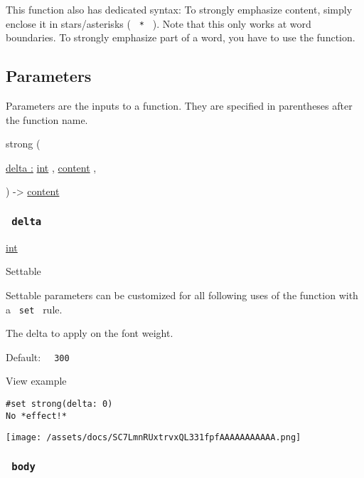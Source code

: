 This function also has dedicated syntax: To strongly emphasize content,
simply enclose it in stars/asterisks ( \texttt{\ *\ } ). Note that this
only works at word boundaries. To strongly emphasize part of a word, you
have to use the function.

\subsection{\texorpdfstring{{ Parameters
}}{ Parameters }}\label{parameters}

\label{parameters-tooltip}
Parameters are the inputs to a function. They are specified in
parentheses after the function name.

{ strong } (

{ \hyperref[parameters-delta]{delta :}
\href{/docs/reference/foundations/int/}{int} , } {
\href{/docs/reference/foundations/content/}{content} , }

) -\textgreater{} \href{/docs/reference/foundations/content/}{content}

\subsubsection{\texorpdfstring{\texttt{\ delta\ }}{ delta }}\label{parameters-delta}

\href{/docs/reference/foundations/int/}{int}

{{ Settable }}

\label{parameters-delta-settable-tooltip}
Settable parameters can be customized for all following uses of the
function with a \texttt{\ set\ } rule.

The delta to apply on the font weight.

Default: \texttt{\ }{\texttt{\ 300\ }}\texttt{\ }


View example

\begin{verbatim}
#set strong(delta: 0)
No *effect!*
\end{verbatim}

\texttt{[image: /assets/docs/SC7LmnRUxtrvxQL331fpfAAAAAAAAAAA.png]}

\subsubsection{\texorpdfstring{\texttt{\ body\ }}{ body }}\label{parameters-body}

